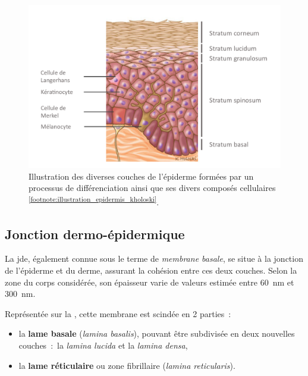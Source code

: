  \begin{figure}[H]
    \centering
    \includegraphics[width=0.9\linewidth]{contents/chapter_1/resources/illustration_epidermis_kholoski.pdf}
    \caption{Illustration des diverses couches de l'épiderme formées par un processus de différenciation ainsi que ses divers composés cellulaires \textsuperscript{\ref{footnote:illustration_epidermis_kholoski}}.}
    \label{fig:illustration_epidermis_kholoski}
\end{figure}\par

\addtocounter{footnote}{1}
\clearpage

\subsection{Jonction dermo-épidermique}
La \gls{jde}, également connue sous le terme de \textit{membrane basale}, se situe à la jonction de l’épiderme et du derme, assurant la cohésion entre ces deux couches. Selon la zone du corps considérée, son épaisseur varie de valeurs estimée entre \SI{60}{\nano\metre} et \SI{300}{\nano\metre}.\par

Représentée sur la , cette membrane est scindée en 2 parties~:
\begin{itemize}
    \item la \textbf{lame basale} (\textit{lamina basalis}), pouvant être subdivisée en deux nouvelles couches~:~la \textit{lamina lucida} et la \textit{lamina densa},
    \item la \textbf{lame réticulaire} ou zone fibrillaire (\textit{lamina reticularis}).
\end{itemize}\par

